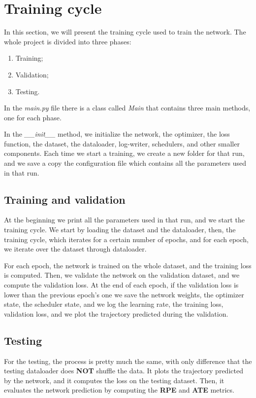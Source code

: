 \section{Training cycle}\label{sec:training-cycle}
In this section, we will present the training cycle used to train the network.
The whole project is divided into three phases:
\begin{enumerate}
    \item Training;
    \item Validation;
    \item Testing.
\end{enumerate}
In the \textit{main.py} file there is a class called \textit{Main} that contains three main methods, one for each phase.

In the \textit{\_\_init\_\_} method, we initialize the network, the optimizer, the loss function, the dataset, the dataloader, log-writer, schedulers, and other smaller components.
Each time we start a training, we create a new folder for that run, and we save a copy the configuration file which contains all the parameters used in that run.

\subsection{Training and validation}\label{subsec:training}
At the beginning we print all the parameters used in that run, and we start the training cycle.
We start by loading the dataset and the dataloader, then, the training cycle, which iterates for a certain number of epochs, and for each epoch, we iterate over the dataset through dataloader.

For each epoch, the network is trained on the whole dataset, and the training loss is computed.
Then, we validate the network on the validation dataset, and we compute the validation loss.
At the end of each epoch, if the validation loss is lower than the previous epoch's one we save the network weights, the optimizer state, the scheduler state, and we log the learning rate, the training loss, validation loss, and we plot the trajectory predicted during the validation.

\subsection{Testing}\label{subsec:testing}

For the testing, the process is pretty much the same, with only difference that the testing dataloader does \textbf{NOT} shuffle the data.
It plots the trajectory predicted by the network, and it computes the loss on the testing dataset.
Then, it evaluates the network prediction by computing the \textbf{RPE} and \textbf{ATE} metrics.